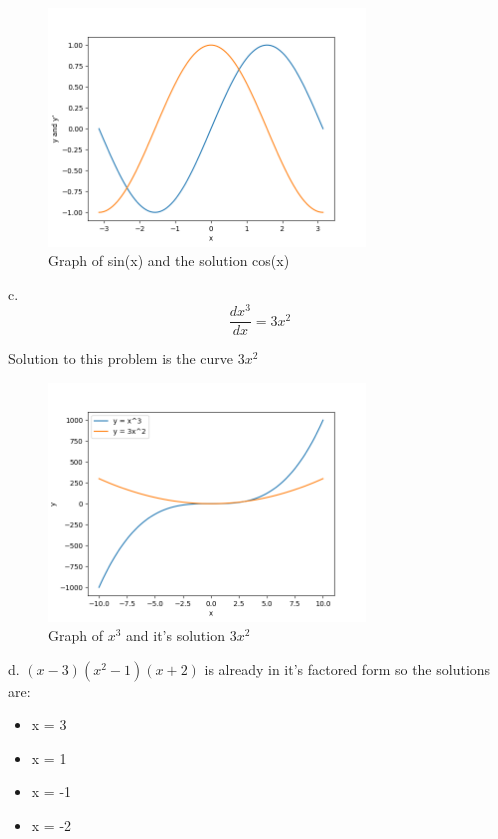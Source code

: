\begin{figure}[htbp]
  \centerline{\includegraphics[width=0.75\textwidth]{images/gradient_ex2.png}}
  \caption{Graph of sin(x) and the solution cos(x)}
  \label{fig:gradient_ex2}
\end{figure}

c. 
\begin{equation}
  \frac{d x^3}{d x} = 3x^2 
\end{equation}

Solution to this problem is the curve $3x^2$
\begin{figure}[htbp]
  \centerline{\includegraphics[width=0.75\textwidth]{images/gradient_ex3.png}}
  \caption{Graph of $x^3$ and it's solution $3x^2$}
  \label{fig:gradient_ex3}
\end{figure}

d. 
$(x-3)(x^2-1)(x+2)$ is already in it's factored form so the solutions are:
\begin{itemize}
  \item x = 3
  \item x = 1
  \item x = -1
  \item x = -2
\end{itemize}  


